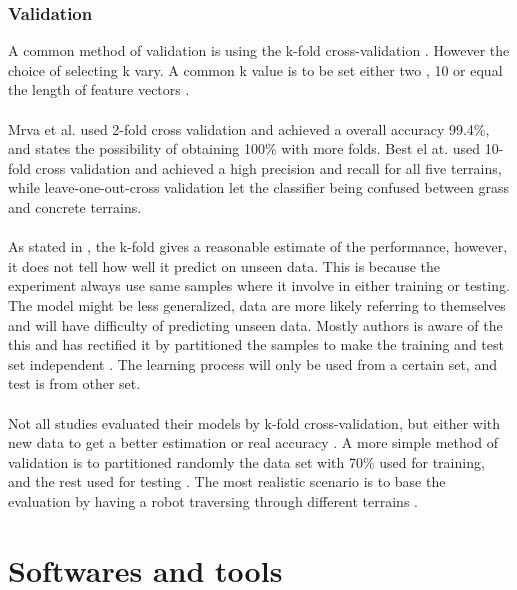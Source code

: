 \documentclass[USenglish]{ifimaster}  %
\begin{document}
\subsection{Validation}\label{subseq:validation}
A common method of validation is using the k-fold cross-validation \cite{DBLP:conf/itat/MrvaF15,6784609,6386243,Hoffmann20141790,6849778,7387710}. However the choice of selecting k vary. A common k value is to be set either two \cite{DBLP:conf/itat/MrvaF15,6784609}, 10 \cite{26b23e912c654fe4b7478fd910130195,6386243,Hoffmann20141790,6849778,7387710} or equal the length of feature vectors \cite{26b23e912c654fe4b7478fd910130195}.
\\
\\
Mrva et al. \cite{DBLP:conf/itat/MrvaF15} used 2-fold cross validation and achieved a overall accuracy 99.4\%, and states the possibility of obtaining 100\% with more folds. Best el at. \cite{26b23e912c654fe4b7478fd910130195} used 10-fold cross validation and achieved a high precision and recall for all five terrains, while leave-one-out-cross validation let the classifier being confused between grass and concrete terrains. 
\\
\\
As stated in \cite{7387710}, the k-fold gives a reasonable estimate of the performance, however, it does not tell how well it predict on unseen data. This is because the experiment always use same samples where it involve in either training or testing. The model might be less generalized, data are more likely referring to themselves and will have difficulty of predicting unseen data. Mostly authors is aware of the this and has rectified it by partitioned the samples to make the training and test set independent \cite{26b23e912c654fe4b7478fd910130195}. The learning process will only be used from a certain set, and test is from other set.
\\
\\
Not all studies evaluated their models by k-fold cross-validation, but either with new data to get a better estimation or real accuracy \cite{5509309,Walas2015,5752869}. A more simple method of validation is to partitioned randomly the data set with 70\% used for training, and the rest used for testing \cite{5752869}. The most realistic scenario is to base the evaluation by having a robot traversing through different terrains \cite{DBLP:conf/itat/MrvaF15}.


\chapter{Softwares and tools}
	
\end{document}
